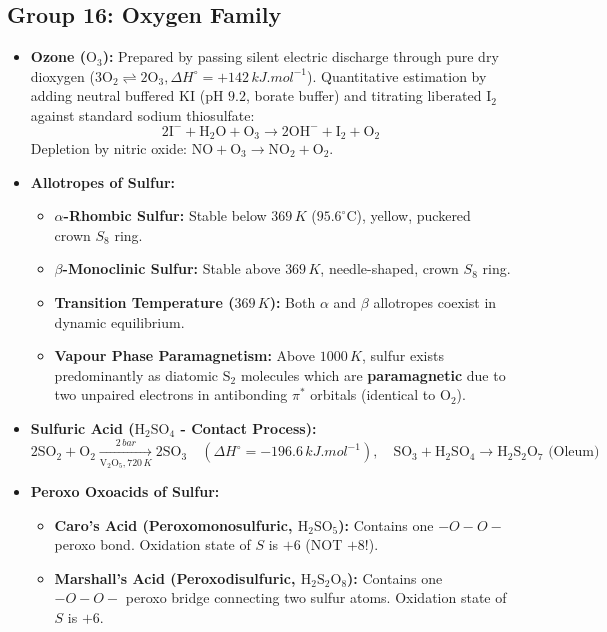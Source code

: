 \documentclass[10pt,a4paper]{article}
\begin{document}
\subsection{Group 16: Oxygen Family}
\begin{itemize}
  \item \textbf{Ozone ($\mathrm{O_3}$):} Prepared by passing silent electric discharge through pure dry dioxygen ($3\mathrm{O_2 \rightleftharpoons 2O_3}, \Delta H^\circ = +142\,\si{kJ.mol^{-1}}$). Quantitative estimation by adding neutral buffered $\mathrm{KI}$ ($\text{pH } 9.2$, borate buffer) and titrating liberated $\mathrm{I_2}$ against standard sodium thiosulfate:
  \begin{equation}
    2\mathrm{I^-} + \mathrm{H_2O} + \mathrm{O_3} \longrightarrow 2\mathrm{OH^-} + \mathrm{I_2} + \mathrm{O_2}
  \end{equation}
  Depletion by nitric oxide: $\mathrm{NO + O_3 \to NO_2 + O_2}$.
  \item \textbf{Allotropes of Sulfur:}
  \begin{itemize}
    \item \textbf{$\alpha$-Rhombic Sulfur:} Stable below $369\,\si{K}$ ($95.6^\circ\text{C}$), yellow, puckered crown $S_8$ ring.
    \item \textbf{$\beta$-Monoclinic Sulfur:} Stable above $369\,\si{K}$, needle-shaped, crown $S_8$ ring.
    \item \textbf{Transition Temperature ($369\,\si{K}$):} Both $\alpha$ and $\beta$ allotropes coexist in dynamic equilibrium.
    \item \textbf{Vapour Phase Paramagnetism:} Above $1000\,\si{K}$, sulfur exists predominantly as diatomic $\mathbf{\mathrm{S_2}}$ molecules which are \textbf{paramagnetic} due to two unpaired electrons in antibonding $\pi^*$ orbitals (identical to $\mathrm{O_2}$).
  \end{itemize}
  \item \textbf{Sulfuric Acid ($\mathrm{H_2SO_4}$ - Contact Process):}
  \begin{equation}
    2\mathrm{SO_2} + \mathrm{O_2} \xrightarrow[\mathrm{V_2O_5}, 720\,\si{K}]{2\,\si{bar}} 2\mathrm{SO_3} \quad (\Delta H^\circ = -196.6\,\si{kJ.mol^{-1}}), \quad \mathrm{SO_3} + \mathrm{H_2SO_4} \to \mathrm{H_2S_2O_7}\text{ (Oleum)}
  \end{equation}
  \item \textbf{Peroxo Oxoacids of Sulfur:}
  \begin{itemize}
    \item \textbf{Caro's Acid (Peroxomonosulfuric, $\mathrm{H_2SO_5}$):} Contains one $-O-O-$ peroxo bond. Oxidation state of $S$ is \textbf{$+6$} (NOT $+8$!).
    \item \textbf{Marshall's Acid (Peroxodisulfuric, $\mathrm{H_2S_2O_8}$):} Contains one $-O-O-$ peroxo bridge connecting two sulfur atoms. Oxidation state of $S$ is \textbf{$+6$}.
  \end{itemize}
\end{itemize}
\end{document}
